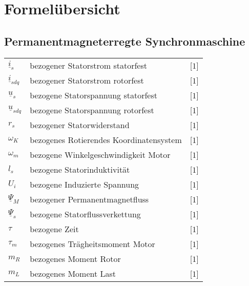 \section{Formelübersicht}
\subsection{Permanentmagneterregte Synchronmaschine}
\begin{tabular}{L{2cm}lR{2cm}}
	$\underline{i}_s$  &bezogener Statorstrom statorfest &[$1$]\\
	$\underline{i}_{sdq}$  &bezogener Statorstrom rotorfest &[$1$]\\
	$\underline{u}_s$ &bezogene Statorspannung statorfest & [$1$]\\
	$\underline{u}_{sdq}$ &bezogene Statorspannung rotorfest & [$1$]\\
	$r_s$  &bezogener Statorwiderstand &[$1$] \\
	$\omega_K$  &bezogenes Rotierendes Koordinatensystem &[$1$]\\
	$\omega_m$ &bezogene Winkelgeschwindigkeit Motor & [$1$]\\
	$l_s$ &bezogene Statorinduktivität & [$1$]\\
	$U_i$ &bezogene Induzierte Spannung & [$1$]\\
	$\underline{\Psi}_M$ &bezogener Permanentmagnetfluss & [$1$]\\
	$\underline{\Psi}_s$ &bezogene Statorflussverkettung & [$1$]\\
	$\tau$ &bezogene Zeit & [$1$]\\
	$\tau_m$ &bezogenes Trägheitsmoment Motor & [$1$]\\
	$m_R$ &bezogenes Moment Rotor & [$1$]\\
	$m_L$ &bezogenes Moment Last & [$1$]\\
\end{tabular}\\
